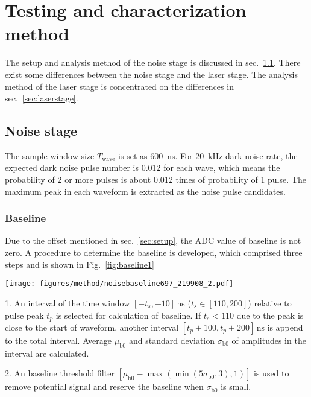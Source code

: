 \section{Testing and characterization method}
\label{Method}
The setup and analysis method of the noise stage is discussed in sec.~\ref{sec:noisestage}. There exist some differences between the noise stage and the laser stage. The analysis method of the laser stage is concentrated on the differences in sec.~\ref{sec:laserstage}.
\subsection{Noise stage}
\label{sec:noisestage}
The sample window size $T_{\mathrm{wave}}$ is set as \SI{600}{ns}. For \SI{20}{kHz} dark noise rate, the expected dark noise pulse number is 0.012 for each wave, which means the probability of 2 or more pulses is about 0.012 times of probability of 1 pulse. The maximum peak in each waveform is extracted as the noise pulse candidates.
\subsubsection{Baseline}
Due to the offset mentioned in sec.~\ref{sec:setup}, the ADC value of baseline is not zero. A procedure to determine the baseline is developed, which comprised three steps and is shown in Fig.~\ref{fig:baseline1}
\begin{figure*}[!htbp]
    \centering
    \texttt{[image: figures/method/noisebaseline697\_219908\_2.pdf]}
    \caption{An example of a large waveform in noise stage. The vertical green line indicates the peak of pulse. The horizonal blue dash line is the baseline. The rise time and fall time are the width of pink and green rectangle.}
    \label{fig:baseline1}
\end{figure*}

1. An interval of the time window $[-t_s,-10]$\,ns ($t_s\in[110,200]$) relative to pulse peak $t_p$ is selected for calculation of baseline. If $t_s < 110$ due to the peak is close to the start of waveform, another interval $[t_p+100,t_p+200]$\,ns is append to the total interval. Average $\mu_{\mathrm{b0}}$ and standard deviation $\sigma_{\mathrm{b0}}$ of amplitudes in the interval are calculated.

2. An baseline threshold filter $[\mu_{\mathrm{b0}}-\max(\min(5\sigma_{\mathrm{b0}},3),1)]$ is used to remove potential signal and reserve the baseline when $\sigma_{\mathrm{b0}}$ is small.

